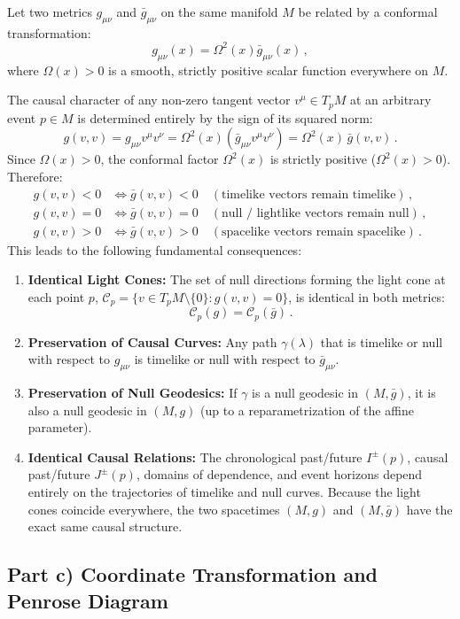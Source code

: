 \documentclass[12pt]{article}
\newcommand{\be}{\begin{equation}}
\newcommand{\ee}{\end{equation}}
\begin{document}
Let two metrics $g_{\mu\nu}$ and $\bar g_{\mu\nu}$ on the same manifold $M$ be related by a conformal transformation:
\be
g_{\mu\nu}(x) = \Omega^2(x) \bar g_{\mu\nu}(x) \,,
\ee
where $\Omega(x) > 0$ is a smooth, strictly positive scalar function everywhere on $M$.

The causal character of any non-zero tangent vector $v^\mu \in T_p M$ at an arbitrary event $p \in M$ is determined entirely by the sign of its squared norm:
\be
g(v, v) = g_{\mu\nu} v^\mu v^\nu = \Omega^2(x) \left( \bar g_{\mu\nu} v^\mu v^\nu \right) = \Omega^2(x) \, \bar g(v, v) \,.
\ee
Since $\Omega(x) > 0$, the conformal factor $\Omega^2(x)$ is strictly positive ($\Omega^2(x) > 0$). Therefore:
\begin{align}
g(v,v) < 0 &\iff \bar g(v,v) < 0 \quad (\text{timelike vectors remain timelike}) \,, \\
g(v,v) = 0 &\iff \bar g(v,v) = 0 \quad (\text{null / lightlike vectors remain null}) \,, \\
g(v,v) > 0 &\iff \bar g(v,v) > 0 \quad (\text{spacelike vectors remain spacelike}) \,.
\end{align}
This leads to the following fundamental consequences:
\begin{enumerate}
    \item \textbf{Identical Light Cones:} The set of null directions forming the light cone at each point $p$, $\mathcal{C}_p = \{ v \in T_p M \setminus \{0\} : g(v,v) = 0 \}$, is identical in both metrics:
    \be
    \mathcal{C}_p(g) = \mathcal{C}_p(\bar g) \,.
    \ee
    \item \textbf{Preservation of Causal Curves:} Any path $\gamma(\lambda)$ that is timelike or null with respect to $g_{\mu\nu}$ is timelike or null with respect to $\bar g_{\mu\nu}$.
    \item \textbf{Preservation of Null Geodesics:} If $\gamma$ is a null geodesic in $(M, \bar g)$, it is also a null geodesic in $(M, g)$ (up to a reparametrization of the affine parameter).
    \item \textbf{Identical Causal Relations:} The chronological past/future $I^\pm(p)$, causal past/future $J^\pm(p)$, domains of dependence, and event horizons depend entirely on the trajectories of timelike and null curves. Because the light cones coincide everywhere, the two spacetimes $(M, g)$ and $(M, \bar g)$ have the exact same causal structure.
\end{enumerate}

\subsection*{Part c) Coordinate Transformation and Penrose Diagram}
\end{document}
